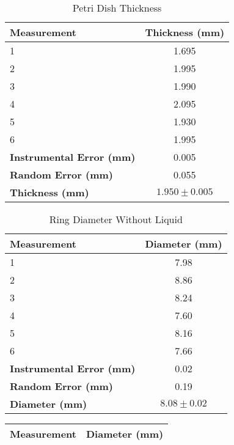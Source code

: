 \begin{center}
    \begin{table}[!ht]
        \centering
        \begin{tabular}{|l|c|}
        \hline
            \textbf{Measurement} & \textbf{Thickness (mm)}  \\ \hline
            1 & 1.695 \\ \hline
            2 & 1.995 \\ \hline
            3 & 1.990  \\ \hline
            4 & 2.095 \\ \hline
            5 & 1.930 \\ \hline
            6 & 1.995 \\ \hline \hline
            \textbf{Instrumental Error (mm)} & 0.005 \\ \hline
            \textbf{Random Error (mm)} & 0.055 \\ \hline
            \textbf{Thickness (mm)}   & $1.950\pm0.005$ \\ \hline
        \end{tabular}
        \caption{Petri Dish Thickness}
    \end{table}
    \begin{table}[!ht]
    \centering
    \begin{tabular}{|l|c|}
    \hline
        \textbf{Measurement} & \textbf{Diameter (mm)} \\ \hline
        1 & 7.98 \\ \hline
        2 & 8.86 \\ \hline
        3 & 8.24 \\ \hline
        4 & 7.60 \\ \hline
        5 & 8.16 \\ \hline
        6 & 7.66 \\ \hline \hline
        \textbf{Instrumental Error (mm)} & 0.02 \\ \hline
        \textbf{Random Error (mm)} & 0.19 \\ \hline
        \textbf{Diameter (mm)}   & $8.08\pm0.02$ \\ \hline
    \end{tabular}
    \caption{Ring Diameter Without Liquid}
    \end{table}
    \begin{table}[!ht]
        \centering
        \begin{tabular}{|l|c|}
        \hline
            \textbf{Measurement} & \textbf{Diameter (mm)} \\ \hline

\end{tabular}
\end{table}
\end{center}
